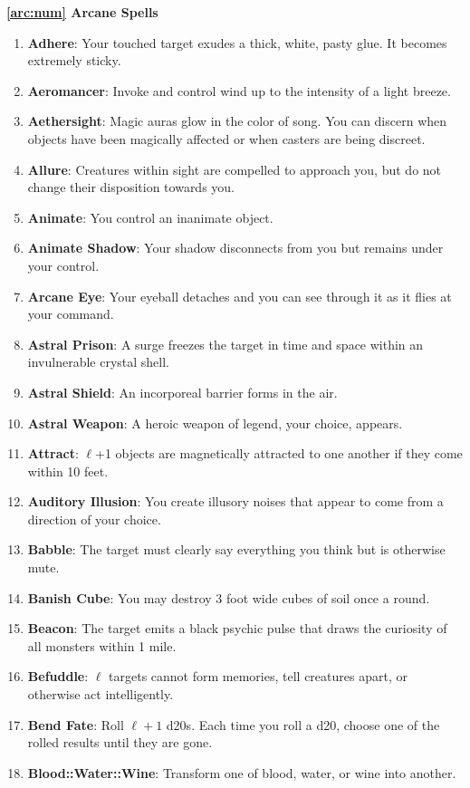 \documentclass[twoside]{article}
\begin{document}
\textbf{\ref*{arc:num} Arcane Spells}
\begin{enumerate}[nosep]
\item \textbf{Adhere}: Your touched target exudes a thick, white, pasty glue. It becomes extremely sticky.
\item \textbf{Aeromancer}: Invoke and control wind up to the intensity of a light breeze.
\item \textbf{Aethersight}: Magic auras glow in the color of song. You can discern when objects have been magically affected or when casters are being discreet.
\item \textbf{Allure}: Creatures within sight are compelled to approach you, but do not change their disposition towards you.
\item \textbf{Animate}: You control an inanimate object.
\item \textbf{Animate Shadow}: Your shadow disconnects from you but remains under your control.
\item \textbf{Arcane Eye}: Your eyeball detaches and you can see through it as it flies at your command.
\item \textbf{Astral Prison}: A surge freezes the target in time and space within an invulnerable crystal shell.
\item \textbf{Astral Shield}: An incorporeal barrier forms in the air.
\item \textbf{Astral Weapon}: A heroic weapon of legend, your choice, appears.
\item \textbf{Attract}: $\ell$+1 objects are magnetically attracted to one another if they come within 10 feet.
\item \textbf{Auditory Illusion}: You create illusory noises that appear to come from a direction of your choice.
\item \textbf{Babble}: The target must clearly say everything you think but is otherwise mute.
\item \textbf{Banish Cube}: You may destroy 3 foot wide cubes of soil once a round.
\item \textbf{Beacon}: The target emits a black psychic pulse that draws the curiosity of all monsters within 1 mile.
\item \textbf{Befuddle}: $\ell$ targets cannot form memories, tell creatures apart, or otherwise act intelligently.
\item \textbf{Bend Fate}: Roll $\ell+1$ d20s. Each time you roll a d20, choose one of the rolled results until they are gone.
\item \textbf{Blood::Water::Wine}: Transform one of blood, water, or wine into another.

\end{enumerate}
\end{document}
